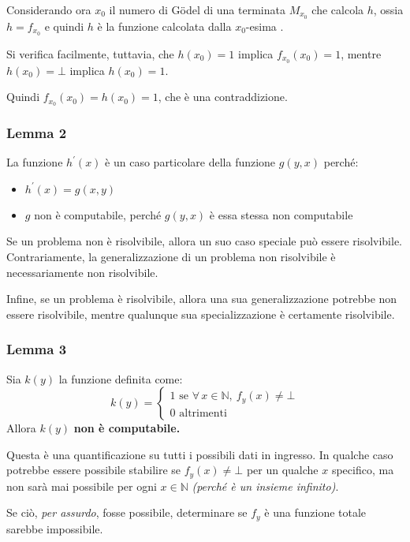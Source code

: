 \documentclass[italian, 10pt]{article}
\begin{document}
Considerando ora \(x_0\) il numero di Gödel di una terminata \TM \(M_{x_0}\) che calcola \(h\), ossia \(h = f_{x_0}\) e quindi \(h\) è la funzione calcolata dalla \(x_0\)-esima \TM.

Si verifica facilmente, tuttavia, che \(h(x_0)= 1\) implica \(f_{x_0}(x_0) = 1\), mentre \(h(x_0) = \bot\) implica \(h(x_0) = 1\).

Quindi \(f_{x_0}(x_0) = h(x_0) = 1\), che è una contraddizione.

\subsubsection{Lemma 2}

La funzione \(h^\prime(x)\) è un caso particolare della funzione \(g(y, x)\) perché:
\begin{itemize}
  \item \(h^\prime(x) = g(x, y)\)
  \item \(g\) non è computabile, perché \(g(y, x)\) è essa stessa non computabile
\end{itemize}

Se un problema non è risolvibile, allora un suo caso speciale può essere risolvibile.
Contrariamente, la generalizzazione di un problema non risolvibile è necessariamente non risolvibile.

Infine, se un problema è risolvibile, allora una sua generalizzazione potrebbe non essere risolvibile, mentre qualunque sua specializzazione è certamente risolvibile.

\subsubsection{Lemma 3}

Sia \(k(y)\) la funzione definita come:
\[ k(y) =
  \begin{cases}
    1 \text{ se } \forall \, x \in \mathbb{N}, \ f_y(x) \neq \bot \\
    0 \text{ altrimenti }
  \end{cases}
\]
Allora \(k(y)\) \textbf{non è computabile.}

Questa è una quantificazione su tutti i possibili dati in ingresso.
In qualche caso potrebbe essere possibile stabilire se \(f_y(x) \neq \bot\) per un qualche \(x\) specifico, ma non sarà mai possibile per ogni \(x \in \mathbb{N}\) \textit{(perché è un insieme infinito)}.

Se ciò, \textit{per assurdo}, fosse possibile, determinare se \(f_y\) è una funzione totale sarebbe impossibile.
\end{document}
